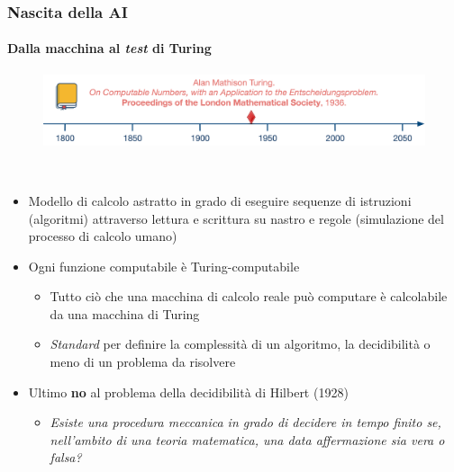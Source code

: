 %
\begin{frame}[t,fragile] \frametitle{Nascita della AI}
	{\scriptsize
		\onslide<1->
            \framesubtitle{Dalla macchina al \textit{test} di Turing}
            \vspace*{-15pt}
            \begin{minipage}[t]{\textwidth}
             	\begin{figure}[ht]
                    \centering
                    \includegraphics[width=\textwidth]{img/AI-timeline-1936-alt.png}
                \end{figure}
            \end{minipage}
            \\\vspace*{3pt}
	    	\begin{minipage}[t]{\textwidth}
				\begin{minipage}[t]{0.6\textwidth}
	    			\begin{itemize}[leftmargin=10pt,align=right]
						\onslide<2->\item[\alert{\faHandORight}] Modello di calcolo astratto in grado di eseguire sequenze di istruzioni (\alert{algoritmi}) attraverso lettura e scrittura su nastro e regole (simulazione del processo di calcolo umano)
						\onslide<3->\item[\alert{\faHandORight}] Ogni funzione computabile è Turing-computabile
                    	\onslide<4->\begin{itemize}[leftmargin=10pt,align=right]
							\item[\alert{\faHandORight}] Tutto ciò che una macchina di calcolo reale può computare è calcolabile da una macchina di Turing
							\item[\alert{\faHandORight}] \textit{Standard} per definire la complessità di un algoritmo, la decidibilità o meno di un problema da risolvere
						\end{itemize}
                    	\item[\alert{\faHandORight}] Ultimo \alert{\textbf{no}} al \alert{problema della decidibilità} di Hilbert (1928)
						\begin{itemize}[leftmargin=10pt,align=right]
							\item[\alert{\faHandORight}] \textit{Esiste una procedura meccanica in grado di decidere in tempo finito se, nell'ambito di una teoria matematica, una data affermazione sia vera o falsa?}

\end{itemize}
\end{itemize}
\end{minipage}
\end{minipage}}
\end{frame}
